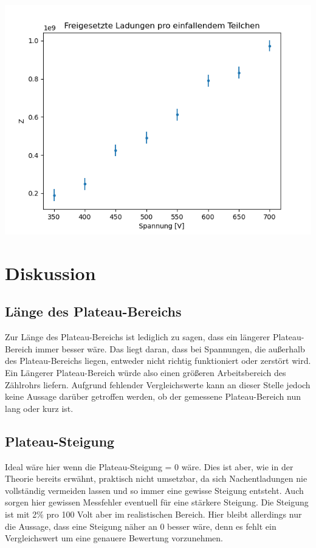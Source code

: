 \includegraphics{7d.png}


\section{Diskussion}

\subsection{Länge des Plateau-Bereichs}

Zur Länge des Plateau-Bereichs ist lediglich zu sagen,
dass ein längerer Plateau-Bereich immer besser wäre.
Das liegt daran, dass bei Spannungen,
die außerhalb des Plateau-Bereichs liegen,
entweder nicht richtig funktioniert oder zerstört wird.
Ein Längerer Plateau-Bereich würde also einen größeren Arbeitsbereich des Zählrohrs liefern.
Aufgrund fehlender Vergleichswerte kann an dieser Stelle jedoch keine Aussage darüber getroffen werden,
ob der gemessene Plateau-Bereich nun lang oder kurz ist.

\subsection{Plateau-Steigung}

Ideal wäre hier wenn die Plateau-Steigung = 0 wäre.
Dies ist aber, wie in der Theorie bereits erwähnt,
praktisch nicht umsetzbar,
da sich Nachentladungen nie vollständig vermeiden lassen 
und so immer eine gewisse Steigung entsteht.
Auch sorgen hier gewissen Messfehler eventuell für eine stärkere Steigung.
Die Steigung ist mit 2$\%$ pro 100 Volt aber im realistischen Bereich.
Hier bleibt allerdings nur die Aussage, dass eine Steigung näher an 0 besser wäre,
denn es fehlt ein Vergleichswert um eine genauere Bewertung vorzunehmen.

